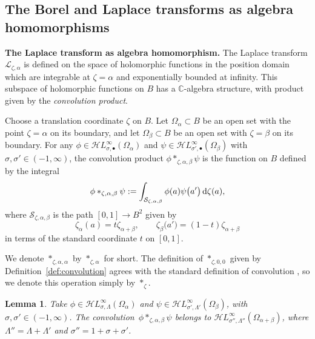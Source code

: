 \documentclass[10pt,a4paper]{amsart}
\newcommand{\singexp}[2]{\mathcal{H}L^\infty_{#1, #2}}
\newcommand{\singexpalg}[1]{\singexp{#1}{\bullet}}
\newcommand{\C}{\mathbb{C}}
\newcommand{\laplace}{\mathcal{L}}
\numberwithin{equation}{section}
\newtheorem{Lemma}[Theorem]{Lemma}
\begin{document}
\subsection{The Borel and Laplace transforms as algebra homomorphisms}\label{sec:borel-laplace-homom}
%
{\bf The Laplace transform as algebra homomorphism.}
The Laplace transform $\laplace_{\zeta,\alpha}$ is defined on the space of holomorphic functions in the position domain which are integrable at $\zeta=\alpha$ and exponentially bounded at infinity. This subspace of holomorphic functions on $B$ has a $\C$-algebra structure, with product given by the \textit{convolution product}.
\begin{Definition}\label{def:convolution}
Choose a translation coordinate $\zeta$ on $B$. Let $\Omega_\alpha \subset B$ be an open set with the point $\zeta = \alpha$ on its boundary, and let $\Omega_\beta \subset B$ be an open set with $\zeta = \beta$ on its boundary. For any $\phi \in \singexpalg{\sigma}(\Omega_\alpha)$ and $\psi \in \singexpalg{\sigma'}(\Omega_\beta)$ with $\sigma,\sigma'\in (-1,\infty)$, the convolution product $\phi \ast_{\zeta, \alpha, \beta} \psi$ is the function on $B$ defined by the integral
\[
\phi \ast_{\zeta, \alpha, \beta} \psi := \int_{\mathcal{S}_{\zeta, \alpha, \beta}} \phi(a) \psi\bigl(a'\bigr)\, {\rm d}\zeta(a),
\]
where $\mathcal{S}_{\zeta, \alpha, \beta}$ is the path $[0, 1] \to B^2$ given by
\[
\zeta_\alpha(a) = t\zeta_{\alpha+\beta}, \qquad
\zeta_\beta\bigl(a'\bigr) = (1-t)\zeta_{\alpha+\beta}
\]
in terms of the standard coordinate $t$ on $[0, 1]$.
\end{Definition}
\begin{notation*}
We denote $\ast_{\zeta,\alpha,\alpha}$ by $\ast_{\zeta,\alpha}$ for short. The definition of $\ast_{\zeta, 0, 0}$ given by Definition~\ref{def:convolution} agrees with the standard definition of convolution \cite[Definition~5.12]{diverg-resurg-i}, so we denote this operation simply by $\ast_\zeta$.
\end{notation*}
\begin{Lemma}
Take $\phi\in\singexp{\sigma}{\Lambda}(\Omega_\alpha)$ and $\psi\in\singexp{\sigma'}{\Lambda'}(\Omega_\beta)$, with $\sigma,\sigma'\in (-1,\infty)$. The convolution~$\phi\ast_{\zeta,\alpha,\beta}\psi$ belongs to $\singexp{\sigma''}{\Lambda''}(\Omega_{\alpha+\beta})$, where $\Lambda'' = \Lambda + \Lambda'$ and $\sigma'' = 1+\sigma+\sigma'$.
\end{Lemma}
\end{document}
